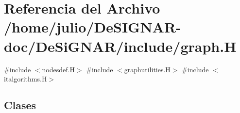 \hypertarget{graph_8_h}{}\section{Referencia del Archivo /home/julio/\+De\+S\+I\+G\+N\+A\+R-\/doc/\+De\+Si\+G\+N\+A\+R/include/graph.H}
\label{graph_8_h}
{\ttfamily \#include $<$nodesdef.\+H$>$}\newline
{\ttfamily \#include $<$graphutilities.\+H$>$}\newline
{\ttfamily \#include $<$italgorithms.\+H$>$}\newline
\subsection*{Clases}
